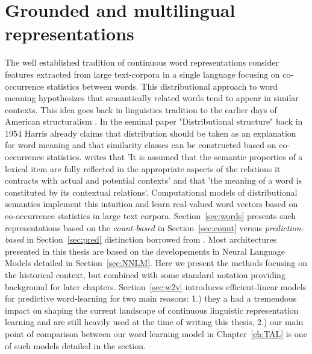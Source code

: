 \section{Grounded and multilingual representations}
The well established tradition of continuous word representations consider
features extracted from large text-corpora in a single language focusing on
co-occurrence statistics between words. 
This distributional approach to word meaning hypothesizes that semantically related words
tend to appear in similar contexts. This idea goes back in linguistics tradition to the
earlier days of American structuralism \citep{nevin2002legacy}. In the seminal paper
"Distributional structure" \citep{harris1954distributional} back in 1954 Harris already claims
that distribution should be taken as an explanation for word meaning and that similarity classes
can be constructed based on co-occurrence statistics.
\cite{cruse1986lexical} writes that 'It is  assumed  that  the  semantic properties  of
a lexical  item  are  fully  reflected  in  the  appropriate  aspects  of  the  relations
it  contracts  with  actual  and  potential  contexts' and that 'the  meaning  of  a word
is constituted  by  its  contextual  relations'. Computational models of distributional
semantics implement this intuition and learn real-valued word vectors based on co-occurrence
statistics in large text corpora. Section~\ref{sec:words} presents 
such representations based on the \emph{count-based} in Section~\ref{sec:count}
versus \emph{prediction-based} in Section~\ref{sec:pred}
distinction borrowed from \cite{baroni2014don}. Most architectures presented  
in this thesis are based on the developements in Neural Language Models detailed
in Section~\ref{sec:NNLM}. Here we present the methods focusing on the historical context,
but combined with some standard notation
providing background for later chapters. Section~\ref{sec:w2v} introduces efficient-linear 
models for predictive word-learning for two main reasons: 1.) they a had a tremendous impact
on shaping the current landscape of continuous linguistic representation learning and are still
heavily used at the time of writing this thesis, 2.) our main point of comparison between
our word learning model in Chapter~\ref{ch:TAL} is one of such models detailed in the section.


